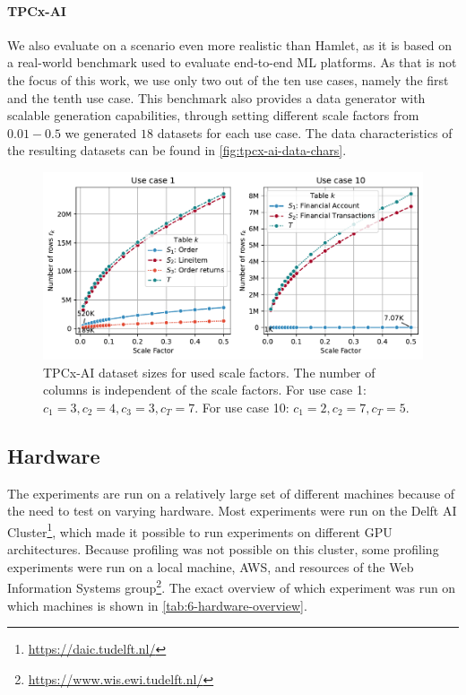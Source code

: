 \paragraph{TPCx-AI \cite{tpcx-ai}} We also evaluate on a scenario even more realistic than Hamlet, as it is based on a real-world benchmark used to evaluate end-to-end ML platforms. As that is not the focus of this work, we use only two out of the ten use cases, namely the first and the tenth use case. This benchmark also provides a data generator with scalable generation capabilities, through setting different scale factors from $0.01-0.5$ we generated $18$ datasets for each use case. The data characteristics of the resulting datasets can be found in \autoref{fig:tpcx-ai-data-chars}.
\begin{figure}
  \centering
  \includegraphics[width=\linewidth]{chapters/06_evaluation/figures/tpcx-ai-data-chars.pdf}
  \caption[TPCx-AI dataset sizes for used scale factors.]{TPCx-AI dataset sizes for used scale factors. The number of columns is independent of the scale factors. For use case 1: $c_1=3, c_2=4, c_3=3, c_T=7$. For use case 10: $c_1=2, c_2=7, c_T=5$.}
  \label{fig:tpcx-ai-data-chars}
\end{figure}




\subsection{Hardware}
\label{subsec:6-hardware}

The experiments are run on a relatively large set of different machines because of the need to test on varying hardware. Most experiments were run on the Delft AI Cluster\footnote{\url{https://daic.tudelft.nl/}}, which made it possible to run experiments on different GPU architectures. Because profiling was not possible on this cluster, some profiling experiments were run on a local machine, AWS, and resources of the Web Information Systems group\footnote{\url{https://www.wis.ewi.tudelft.nl/}}. The exact overview of which experiment was run on which machines is shown in \autoref{tab:6-hardware-overview}.

